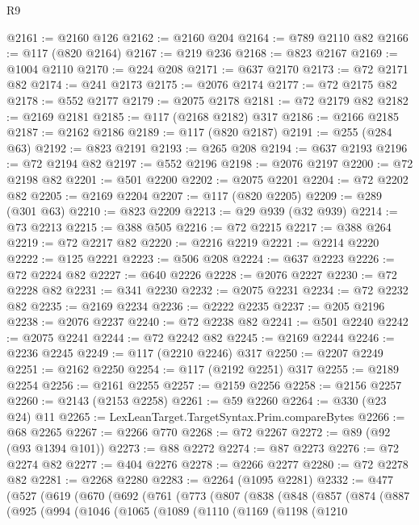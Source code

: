 \begin{lexlean}{R9}
\begin{coremodule}
@2161 := @2160 @126
@2162 := @2160 @204
@2164 := @789 @2110 @82
@2166 := @117 (@820 @2164)
@2167 := @219 @236
@2168 := @823 @2167
@2169 := @1004 @2110
@2170 := @224 @208
@2171 := @637 @2170
@2173 := @72 @2171 @82
@2174 := @241 @2173
@2175 := @2076 @2174
@2177 := @72 @2175 @82
@2178 := @552 @2177
@2179 := @2075 @2178
@2181 := @72 @2179 @82
@2182 := @2169 @2181
@2185 := @117 (@2168 @2182) @317
@2186 := @2166 @2185
@2187 := @2162 @2186
@2189 := @117 (@820 @2187)
@2191 := @255 (@284 @63)
@2192 := @823 @2191
@2193 := @265 @208
@2194 := @637 @2193
@2196 := @72 @2194 @82
@2197 := @552 @2196
@2198 := @2076 @2197
@2200 := @72 @2198 @82
@2201 := @501 @2200
@2202 := @2075 @2201
@2204 := @72 @2202 @82
@2205 := @2169 @2204
@2207 := @117 (@820 @2205)
@2209 := @289 (@301 @63)
@2210 := @823 @2209
@2213 := @29 @939 (@32 @939)
@2214 := @73 @2213
@2215 := @388 @505
@2216 := @72 @2215
@2217 := @388 @264
@2219 := @72 @2217 @82
@2220 := @2216 @2219
@2221 := @2214 @2220
@2222 := @125 @2221
@2223 := @506 @208
@2224 := @637 @2223
@2226 := @72 @2224 @82
@2227 := @640 @2226
@2228 := @2076 @2227
@2230 := @72 @2228 @82
@2231 := @341 @2230
@2232 := @2075 @2231
@2234 := @72 @2232 @82
@2235 := @2169 @2234
@2236 := @2222 @2235
@2237 := @205 @2196
@2238 := @2076 @2237
@2240 := @72 @2238 @82
@2241 := @501 @2240
@2242 := @2075 @2241
@2244 := @72 @2242 @82
@2245 := @2169 @2244
@2246 := @2236 @2245
@2249 := @117 (@2210 @2246) @317
@2250 := @2207 @2249
@2251 := @2162 @2250
@2254 := @117 (@2192 @2251) @317
@2255 := @2189 @2254
@2256 := @2161 @2255
@2257 := @2159 @2256
@2258 := @2156 @2257
@2260 := @2143 (@2153 @2258)
@2261 := @59 @2260
@2264 := @330 (@23 @24) @11
@2265 := LexLeanTarget.TargetSyntax.Prim.compareBytes
@2266 := @68 @2265
@2267 := @2266 @770
@2268 := @72 @2267
@2272 := @89 (@92 (@93 @1394 @101))
@2273 := @88 @2272
@2274 := @87 @2273
@2276 := @72 @2274 @82
@2277 := @404 @2276
@2278 := @2266 @2277
@2280 := @72 @2278 @82
@2281 := @2268 @2280
@2283 := @2264 (@1095 @2281)
@2332 := @477
    (@527
      (@619
        (@670
          (@692
            (@761
              (@773
                (@807
                  (@838
                    (@848
                      (@857
                        (@874
                          (@887
                            (@925
                              (@994
                                (@1046
                                  (@1065
                                    (@1089
                                      (@1110
                                        (@1169
                                          (@1198
                                            (@1210

\end{coremodule}
\end{lexlean}
